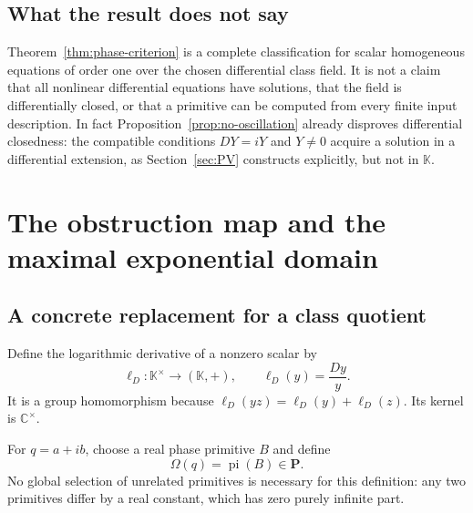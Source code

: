 \documentclass[11pt,a4paper]{article}
\numberwithin{equation}{section}
\theoremstyle{definition}
\theoremstyle{remark}
\newcommand{\K}{\mathbb K}
\newcommand{\C}{\mathbb C}
\newcommand{\PP}{\mathbf P}
\newcommand{\pipart}{\operatorname{pi}}
\newcommand{\Dlog}{\ell_D}
\begin{document}
\subsection{What the result does not say}

Theorem~\ref{thm:phase-criterion} is a complete classification for scalar
homogeneous equations of order one over the chosen differential class field.
It is not a claim that all nonlinear differential equations have solutions,
that the field is differentially closed, or that a primitive can be computed
from every finite input description. In fact Proposition~\ref{prop:no-oscillation}
already disproves differential closedness: the compatible conditions
$DY=iY$ and $Y\ne0$ acquire a solution in a differential extension, as
Section~\ref{sec:PV} constructs explicitly, but not in $\K$.

\section{The obstruction map and the maximal exponential domain}
\label{sec:obstruction}

\subsection{A concrete replacement for a class quotient}

Define the logarithmic derivative of a nonzero scalar by
\[
 \Dlog:\K^\times\longrightarrow(\K,+),\qquad
 \Dlog(y)=\frac{Dy}{y}.
\]
It is a group homomorphism because $\Dlog(yz)=\Dlog(y)+\Dlog(z)$.
Its kernel is $\C^\times$.

For $q=a+ib$, choose a real phase primitive $B$ and define
\begin{equation}\label{eq:obstruction}
 \Omega(q)=\pipart(B)\in\PP.
\end{equation}
No global selection of unrelated primitives is necessary for this
definition: any two primitives differ by a real constant, which has zero
purely infinite part.
\end{document}
